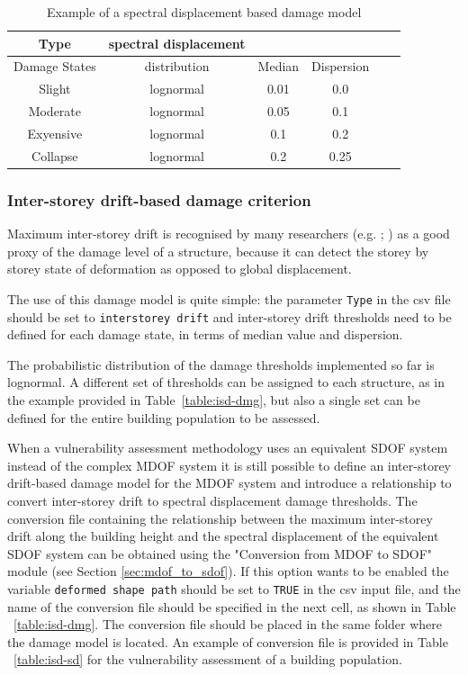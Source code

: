 \begin {table}[htb]
\caption{Example of a spectral displacement based damage model}
\label{table:sd-dmg}
\begin{center}
  \begin{tabular}{ | c | c | c | c | c | c |}
  \hline
    Type & spectral displacement &  & \\ \hline
    Damage States & distribution & Median & Dispersion \\ \hline
    Slight & lognormal & 0.01 & 0.0 \\ \hline
    Moderate & lognormal & 0.05  & 0.1 \\ \hline
    Exyensive & lognormal & 0.1  & 0.2 \\ \hline
    Collapse & lognormal & 0.2  & 0.25 \\ \hline
  \end{tabular}
\end{center}
\end{table}

\subsubsection{Inter-storey drift-based damage criterion}
\label{subsubsec:isd-dmg}
Maximum inter-storey drift is recognised by many researchers (e.g. \cite{VamvatsikosCornell2005}; \cite{RossettoElnashai2005}) as a good proxy of the damage level of a structure, because it can detect the storey by storey state of deformation as opposed to global displacement.

The use of this damage model is quite simple: the parameter \verb=Type= in the csv file should be set to \verb=interstorey drift= and inter-storey drift thresholds need to be defined for each damage state, in terms of median value and dispersion.

The probabilistic distribution of the damage thresholds implemented so far is lognormal. A different set of thresholds can be assigned to each structure, as in the example provided in Table~\ref{table:isd-dmg}, but also a single set can be defined for the entire building population to be assessed.

When a vulnerability assessment methodology uses an equivalent SDOF system instead of the complex MDOF system it is still possible to define an inter-storey drift-based damage model for the MDOF system and introduce a relationship to convert inter-storey drift to spectral displacement damage thresholds. The conversion file containing the relationship between the maximum inter-storey drift along the building height and the spectral displacement of the equivalent SDOF system can be obtained using the "Conversion from MDOF to SDOF" module (see Section \ref{sec:mdof_to_sdof}). If this option wants to be enabled the variable \verb=deformed shape path= should be set to \verb=TRUE= in the csv input file, and the name of the conversion file should be specified in the next cell, as shown in Table ~\ref{table:isd-dmg}. The conversion file should be placed in the same folder where the damage model is located. An example of conversion file is provided in Table ~\ref{table:isd-sd} for the vulnerability assessment of a building population.

